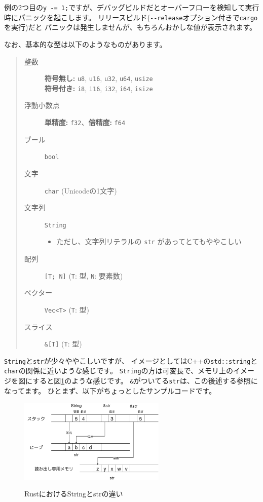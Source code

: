 \documentclass[mingoth,a4paper]{jsarticle}
\begin{document}
例の2つ目の\verb|y -= 1;|ですが、デバッグビルドだとオーバーフローを検知して実行時にパニックを起こします。
リリースビルド(\verb|--release|オプション付きで\texttt{cargo}を実行)だと
パニックは発生しませんが、もちろんおかしな値が表示されます。

なお、基本的な型は以下のようなものがあります。

\begin{quote}
\begin{description}
 \item[整数]
	    \textbf{符号無し:} \texttt{u8}, \texttt{u16}, \texttt{u32}, \texttt{u64}, \texttt{usize}\\
	    \textbf{符号付き:} \texttt{i8}, \texttt{i16}, \texttt{i32}, \texttt{i64}, \texttt{isize}
 \item[浮動小数点] \textbf{単精度:} \texttt{f32}、\textbf{倍精度:} \texttt{f64}
 \item[ブール] \texttt{bool}
 \item[文字] \texttt{char}  (Unicodeの1文字)
 \item[文字列] \texttt{String}
	    \begin{itemize}
	     \item ただし、文字列リテラルの \texttt{str} があってとてもややこしい
	    \end{itemize}
 \item[配列] \texttt{[T; N]} (\texttt{T}: 型,  \texttt{N}: 要素数)
 \item[ベクター] \texttt{Vec<T>} (\texttt{T}: 型)
 \item[スライス] \texttt{\&[T]} (\texttt{T}: 型)
\end{description}
\end{quote}

\texttt{String}と\texttt{str}が少々ややこしいですが、
イメージとしてはC++の\texttt{std::string}と\texttt{char}の関係に近いような感じです。
\texttt{String}の方は可変長で、メモリ上のイメージを図にすると図\ref{fig:str-string}のような感じです。
\texttt{\&}がついてる\texttt{str}は、この後述する参照になってます。
ひとまず、以下がちょっとしたサンプルコードです。

\begin{figure}[htbp]
 \begin{center}
  \includegraphics[keepaspectratio,height=4cm]{./image201903/rustlang-str-string.png}
  \label{fig:str-string}
  \caption{RustにおけるStringとstrの違い}
 \end{center}
\end{figure}
\end{document}
